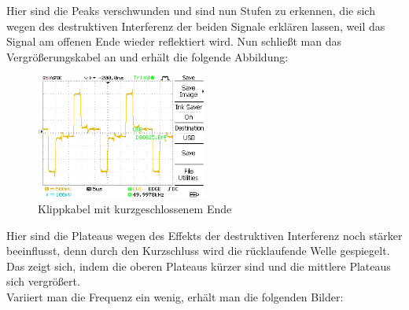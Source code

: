 \documentclass{article}
\begin{document}
Hier sind die Peaks verschwunden und sind nun Stufen zu erkennen, die sich wegen des 
destruktiven Interferenz der beiden Signale erklären lassen, weil das Signal am offenen Ende
wieder reflektiert wird. 
\clearpage
Nun schließt man das Vergrößerungskabel an und erhält die folgende Abbildung:
				\begin{figure}[H]
					\centering
					\includegraphics[width=0.5\textwidth]{MesswerteVersuch1/DS0025.png}
					\caption{Klippkabel mit kurzgeschlossenem Ende}
					\label{fig:DS0025}
				\end{figure}
                
 Hier sind die Plateaus wegen des Effekts der destruktiven Interferenz noch stärker beeinflusst, denn durch 
 den Kurzschluss wird die rücklaufende Welle gespiegelt. Das zeigt sich, indem die oberen Plateaus kürzer sind und die 
 mittlere Plateaus sich vergrößert. \\
 Variiert man die Frequenz ein wenig, erhält man die folgenden Bilder: 
\end{document}
